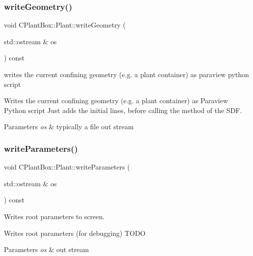 \subsubsection{\texorpdfstring{write\+Geometry()}{writeGeometry()}}
{\footnotesize\ttfamily void C\+Plant\+Box\+::\+Plant\+::write\+Geometry (\begin{DoxyParamCaption}\item[{std\+::ostream \&}]{os }\end{DoxyParamCaption}) const}



writes the current confining geometry (e.\+g. a plant container) as paraview python script 

Writes the current confining geometry (e.\+g. a plant container) as Paraview Python script Just adds the initial lines, before calling the method of the S\+DF.


\begin{DoxyParams}{Parameters}
{\em os} & typically a file out stream \\
\hline
\end{DoxyParams}
\mbox{\label{classCPlantBox_1_1Plant_a7459ed6869064fd4be5a519ebb46cf90}} 
\subsubsection{\texorpdfstring{write\+Parameters()}{writeParameters()}}
{\footnotesize\ttfamily void C\+Plant\+Box\+::\+Plant\+::write\+Parameters (\begin{DoxyParamCaption}\item[{std\+::ostream \&}]{os }\end{DoxyParamCaption}) const}



Writes root parameters to screen. 

Writes root parameters (for debugging) T\+O\+DO


\begin{DoxyParams}{Parameters}
{\em os} & out stream \\
\hline
\end{DoxyParams}
\mbox{\label{classCPlantBox_1_1Plant_ae1fde3d22aa8a6b8e91684b68668a422}} 
